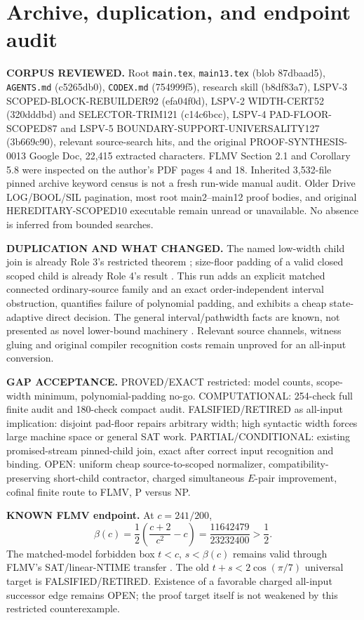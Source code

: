 \documentclass[11pt]{article}
\begin{document}
\section{Archive, duplication, and endpoint audit}
\textbf{CORPUS REVIEWED.} Root \texttt{main.tex}, \texttt{main13.tex} (blob 87dbaad5), \texttt{AGENTS.md} (c5265db0), \texttt{CODEX.md} (754999f5), research skill (b8df83a7), LSPV-3 SCOPED-BLOCK-REBUILDER92 (efa04f0d), LSPV-2 WIDTH-CERT52 (320dddbd) and SELECTOR-TRIM121 (c14c6bcc), LSPV-4 PAD-FLOOR-SCOPED87 and LSPV-5 BOUNDARY-SUPPORT-UNIVERSALITY127 (3b669c90), relevant source-search hits, and the original PROOF-SYNTHESIS-0013 Google Doc, 22,415 extracted characters. FLMV Section 2.1 and Corollary 5.8 were inspected on the author's PDF pages 4 and 18. Inherited 3,532-file pinned archive keyword census is not a fresh run-wide manual audit. Older Drive LOG/BOOL/SIL pagination, most root main2--main12 proof bodies, and original HEREDITARY-SCOPED10 executable remain unread or unavailable. No absence is inferred from bounded searches.

\textbf{DUPLICATION AND WHAT CHANGED.} The named low-width child join is already Role 3's restricted theorem \cite{scope92}; size-floor padding of a valid closed scoped child is already Role 4's result \cite{pad87}. This run adds an explicit matched connected ordinary-source family and an exact order-independent interval obstruction, quantifies failure of polynomial padding, and exhibits a cheap state-adaptive direct decision. The general interval/pathwidth facts are known, not presented as novel lower-bound machinery \cite{freuder,kinnersley}. Relevant source channels, witness gluing and original compiler recognition costs remain unproved for an all-input conversion.

\textbf{GAP ACCEPTANCE.} PROVED/EXACT restricted: model counts, scope-width minimum, polynomial-padding no-go. COMPUTATIONAL: 254-check full finite audit and 180-check compact audit. FALSIFIED/RETIRED as all-input implication: disjoint pad-floor repairs arbitrary width; high syntactic width forces large machine space or general SAT work. PARTIAL/CONDITIONAL: existing promised-stream pinned-child join, exact after correct input recognition and binding. OPEN: uniform cheap source-to-scoped normalizer, compatibility-preserving short-child contractor, charged simultaneous $E$-pair improvement, cofinal finite route to FLMV, P versus NP.

\textbf{KNOWN FLMV endpoint.} At $c=241/200$,
\[
 \beta(c)=\frac12\left(\frac{c+2}{c^2}-c\right)
 =\frac{11642479}{23232400}>\frac12.
\]
The matched-model forbidden box $t<c$, $s<\beta(c)$ remains valid through FLMV's SAT/linear-NTIME transfer \cite{flmv}. The old $t+s<2\cos(\pi/7)$ universal target is FALSIFIED/RETIRED. Existence of a favorable charged all-input successor edge remains OPEN; the proof target itself is not weakened by this restricted counterexample.
\end{document}
